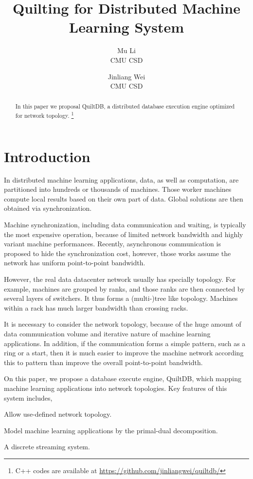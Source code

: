 \documentclass{acm_proc_article-sp}
\title{Quilting for Distributed Machine Learning System}
\author{Mu Li \\ CMU CSD \and Jinliang Wei\\ CMU CSD}
\begin{document}
\maketitle

\begin{abstract}
In this paper we proposal QuiltDB, a distributed database execution engine optimized for network
topology.
\footnote{C++ codes are available at \url{https://github.com/jinliangwei/quiltdb/}}
\end{abstract}

\section{Introduction}

In distributed machine learning applications, data,  as well as computation, are
partitioned into hundreds or  thousands of machines. Those
worker machines compute local results based on their own part of data. Global solutions
are then obtained via synchronization.

Machine synchronization, including data communication and waiting, is typically
the most expensive operation, because of limited network bandwidth and highly
variant machine performances. Recently, asynchronous communication is proposed
to hide the synchronization cost, however, those works assume the network has
uniform point-to-point bandwidth.

However, the real data datacenter network usually has specially topology. For
example, machines are grouped by ranks, and those ranks are then connected by
several layers of switchers. It thus forms a (multi-)tree like
topology. Machines within a rack has much larger bandwidth than crossing racks.

It is necessary to consider the network topology, because of the huge amount of
data communication volume and iterative nature of  machine learning
applications. In addition, if the communication forms a simple pattern, such as
a ring or a start, then it is much easier to improve the machine network
according this to pattern than improve the overall point-to-point bandwidth.

On this paper, we propose a database execute engine, QuiltDB, which mapping
machine learning applications into network topologies. Key features of this
system includes,

\begin{itemize*}
\item Allow use-defined network topology.
\item Model machine learning applications by the primal-dual decomposition.
\item A discrete streaming system.
\end{itemize*}
\end{document}
